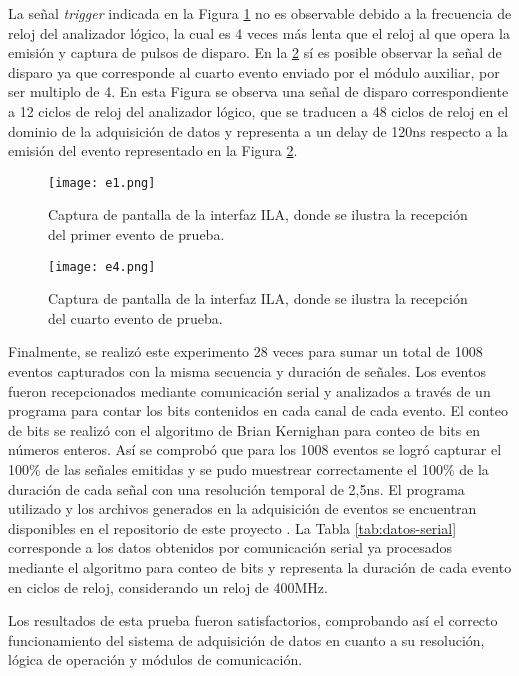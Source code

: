 	La señal \textit{trigger} indicada en la Figura \ref{img:e1} no es observable debido a la frecuencia de reloj del analizador lógico, la cual es 4 veces más lenta que el reloj al que opera la emisión y captura de pulsos de disparo. En la \ref{img:e4} sí es posible observar la señal de disparo ya que corresponde al cuarto evento enviado por el módulo auxiliar, por ser multiplo de 4. En esta Figura se observa una señal de disparo correspondiente a 12 ciclos de reloj del analizador lógico, que se traducen a 48 ciclos de reloj en el dominio de la adquisición de datos y representa a un delay de 120ns respecto a la emisión del evento representado en la Figura \ref{img:e4}.
	
	\begin{figure}[ht]
		\centering
		\texttt{[image: e1.png]}
		\caption{Captura de pantalla de la interfaz ILA, donde se ilustra la recepción del primer evento de prueba.}
		\label{img:e1}
	\end{figure}
	
	
	\begin{figure}[ht]
		\centering
		\texttt{[image: e4.png]}
		\caption{Captura de pantalla de la interfaz ILA, donde se ilustra la recepción del cuarto evento de prueba.}
		\label{img:e4}
	\end{figure}

	Finalmente, se realizó este experimento 28 veces para sumar un total de 1008 eventos capturados con la misma secuencia y duración de señales. Los eventos fueron recepcionados mediante comunicación serial y analizados a través de un programa para contar los bits contenidos en cada canal de cada evento. El conteo de bits se realizó con el algoritmo de Brian Kernighan\cite{SinghCountC++} para conteo de bits en números enteros. Así se comprobó que para los 1008 eventos se logró capturar el 100\% de las señales emitidas y se pudo muestrear correctamente el 100\% de la duración de cada señal con una resolución temporal de 2,5ns. El programa utilizado y los archivos generados en la adquisición de eventos se encuentran disponibles en el repositorio de este proyecto \cite{GonzalezMuonRepository}. La Tabla \ref{tab:datos-serial} corresponde a los datos obtenidos por comunicación serial ya procesados mediante el algoritmo para conteo de bits y representa la duración de cada evento en ciclos de reloj, considerando un reloj de 400MHz.	
	
	Los resultados de esta prueba fueron satisfactorios, comprobando así el correcto funcionamiento del sistema de adquisición de datos en cuanto a su resolución, lógica de operación y módulos de comunicación.
	
